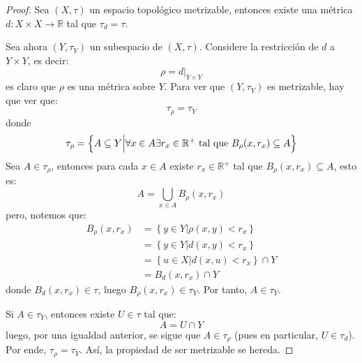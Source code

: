 \documentclass[12pt]{report}
\theoremstyle{largebreak}
\newcommand\cf[3]{\ensuremath{#1:#2\rightarrow#3}}
\begin{document}
    \begin{proof}
        Sea $(X,\tau)$ un espacio topológico metrizable, entonces existe una métrica $\cf{d}{X\times X}{\mathbb{R}}$ tal que $\tau_d=\tau$.

        Sea ahora $(Y,\tau_Y)$ un subespacio de $(X,\tau)$. Considere la restricción de $d$ a $Y\times Y$, es decir:
        \begin{equation*}
            \rho=d\Big|_{Y\times Y}
        \end{equation*}
        es claro que $\rho$ es una métrica sobre $Y$. Para ver que $(Y,\tau_Y)$ es metrizable, hay que ver que:
        \begin{equation*}
            \tau_\rho=\tau_Y
        \end{equation*}
        donde
        \begin{equation*}
            \tau_\rho=\left\{A\subseteq Y\Big|\forall x\in A\exists r_x\in\mathbb{R}^+\textup{ tal que }B_\rho(x,r_x)\subseteq A \right\}
        \end{equation*}
        Sea $A\in\tau_\rho$, entonces para cada $x\in A$ existe $r_x\in\mathbb{R}^+$ tal que $B_\rho(x,r_x)\subseteq A$, esto es:
        \begin{equation*}
            A=\bigcup_{x\in A}B_\rho(x,r_x)
        \end{equation*}
        pero, notemos que:
        \begin{equation*}
            \begin{split}
                B_\rho(x,r_x)&=\left\{y\in Y\Big|\rho(x,y)<r_x \right\}\\
                &=\left\{y\in Y\Big|d(x,y)<r_x \right\}\\
                &=\left\{u\in X\Big|d(x,u)<r_x \right\}\cap Y \\
                &= B_d(x,r_x)\cap Y
            \end{split}
        \end{equation*}
        donde $B_d(x,r_x)\in\tau$, luego $B_\rho(x,r_x)\in\tau_Y$. Por tanto, $A\in\tau_Y$.

        Si $A\in\tau_Y$, entonces existe $U\in\tau$ tal que:
        \begin{equation}
            A=U\cap Y
        \end{equation}
        luego, por una igualdad anterior, se sigue que $A\in\tau_\rho$ (pues en particular, $U\in\tau_d$). Por ende, $\tau_\rho=\tau_Y$. Así, la propiedad de ser metrizable se hereda.
    \end{proof}
\end{document}

